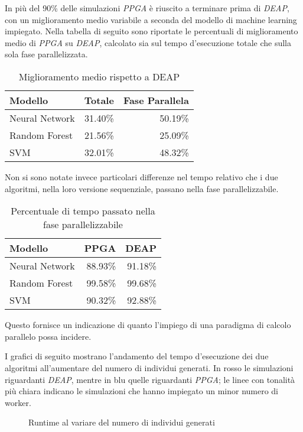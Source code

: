 In più del 90\% delle simulazioni \textit{PPGA} è riuscito a terminare prima di
\textit{DEAP}, con un miglioramento medio variabile a seconda del modello di
machine learning impiegato. Nella tabella di seguito sono riportate le
percentuali di miglioramento medio di \textit{PPGA} su \textit{DEAP},
calcolato sia sul tempo d'esecuzione totale che sulla sola fase parallelizzata.

\begin{table}[H]
	\centering
	\begin{tabular}{lrr}
		\toprule
		Modello        & Totale  & Fase Parallela \\
		\midrule
		Neural Network & 31.40\% & 50.19\%        \\
		Random Forest  & 21.56\% & 25.09\%        \\
		SVM            & 32.01\% & 48.32\%        \\
		\bottomrule
	\end{tabular}
	\caption{Miglioramento medio rispetto a DEAP}
	\label{tab: time_improv_DEAP}
\end{table}

Non si sono notate invece particolari differenze nel tempo relativo che i due
algoritmi, nella loro versione sequenziale, passano nella fase parallelizzabile.

\begin{table}[H]
	\centering
	\begin{tabular}{lrr}
		\toprule
		Modello        & PPGA    & DEAP    \\
		\midrule
		Neural Network & 88.93\% & 91.18\% \\
		Random Forest  & 99.58\% & 99.68\% \\
		SVM            & 90.32\% & 92.88\% \\
		\bottomrule
	\end{tabular}
	\caption{Percentuale di tempo passato nella fase parallelizzabile}
\end{table}

Questo fornisce un indicazione di quanto l'impiego di una paradigma di calcolo
parallelo possa incidere.

I grafici di seguito mostrano l'andamento del tempo d'esecuzione dei due
algoritmi all'aumentare del numero di individui generati. In rosso le
simulazioni riguardanti \textit{DEAP}, mentre in blu quelle riguardanti
\textit{PPGA}; le linee con tonalità più chiara indicano le simulazioni che
hanno impiegato un minor numero di worker.

\begin{figure}[H]
	\centering
	
	\caption{Runtime al variare del numero di individui generati}
	\label{fig: time_pop}
\end{figure}

